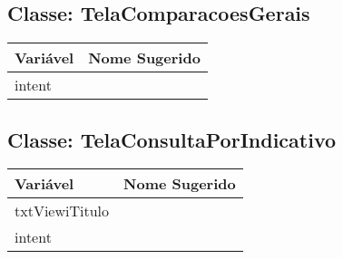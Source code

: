 \documentclass[12pt]{article}
\begin{document}
	\subsection{Classe: TelaComparacoesGerais}
		\begin{table}[H]
			\begin{center}
				\begin{tabular}{l | l}
					\toprule
						Variável & Nome Sugerido\\
					\midrule
						intent & \\
					\bottomrule
				\end{tabular}
			\end{center}
		\end{table}

	\subsection{Classe: TelaConsultaPorIndicativo}
		\begin{table}[H]
			\begin{center}
				\begin{tabular}{l | l}
					\toprule
						Variável & Nome Sugerido\\
					\midrule
						txtViewiTitulo & \\
						intent & \\
					\bottomrule
				\end{tabular}
			\end{center}
		\end{table}
\end{document}

